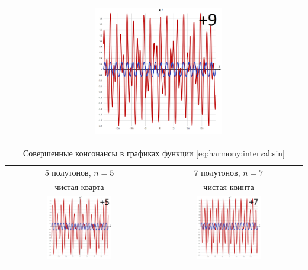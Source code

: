 \begin{table}[!ht]
\begin{tabular}{c|c}
            & \includegraphics[width=0.45\textwidth]{fig/intervals/i09} \\
        \hline\hline
        
    \end{tabular}
\end{table}

\begin{table}[!ht]
    \caption{Совершенные консонансы в графиках функции \ref{eq:harmony:interval:sin}}
    \label{t:harmony:interval:conso-5-7}
    \centering
    \begin{tabular}{c|c}
        \hline\hline
        5 полутонов, $n=5$  & 7 полутонов, $n=7$ \\
        чистая кварта       & чистая квинта \\
        \includegraphics[width=0.45\textwidth]{fig/intervals/i05} 
            & \includegraphics[width=0.45\textwidth]{fig/intervals/i07} \\
        \hline\hline
    \end{tabular}
\end{table}

